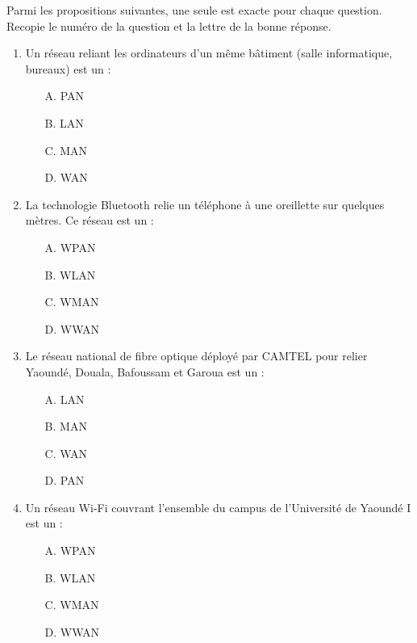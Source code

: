 \documentclass[11pt]{article}
\begin{document}
\begin{exercice}
Parmi les propositions suivantes, une seule est exacte pour chaque question. Recopie le numéro de la question et la lettre de la bonne réponse.

\begin{enumerate}
    \item Un réseau reliant les ordinateurs d'un même bâtiment (salle informatique, bureaux) est un :
    \begin{itemize}
        \item[A.] PAN \item[B.] LAN \item[C.] MAN \item[D.] WAN
    \end{itemize}
    \item La technologie Bluetooth relie un téléphone à une oreillette sur quelques mètres. Ce réseau est un :
    \begin{itemize}
        \item[A.] WPAN \item[B.] WLAN \item[C.] WMAN \item[D.] WWAN
    \end{itemize}
    \item Le réseau national de fibre optique déployé par CAMTEL pour relier Yaoundé, Douala, Bafoussam et Garoua est un :
    \begin{itemize}
        \item[A.] LAN \item[B.] MAN \item[C.] WAN \item[D.] PAN
    \end{itemize}
    \item Un réseau Wi-Fi couvrant l'ensemble du campus de l'Université de Yaoundé I est un :
    \begin{itemize}
        \item[A.] WPAN \item[B.] WLAN \item[C.] WMAN \item[D.] WWAN
    \end{itemize}
\end{enumerate}
\end{exercice}
\end{document}
